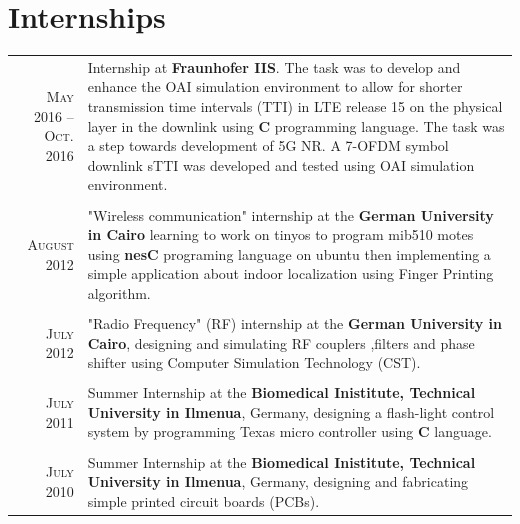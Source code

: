 \documentclass[a4paper,10pt]{article}
\begin{document}
\section{Internships}
\begin{tabular}{r|p{11cm}}
	\textsc{May 2016 – Oct. 2016} & Internship at {\bf Fraunhofer IIS}. The task was to develop and enhance the {OAI} simulation environment to allow for shorter transmission time intervals ({TTI}) in LTE release 15 on the physical layer in the downlink using {\bf C} programming language. The task was a step towards development of 5G NR. A 7-OFDM symbol downlink {sTTI} was developed and tested using OAI simulation environment. \\
	& \\
	\textsc{August} 2012 & "Wireless communication" internship at the {\bf German University in Cairo} learning to work on tinyos to program mib510 motes using \textbf{nesC} programing language on ubuntu then implementing a simple application about indoor localization using Finger Printing algorithm.\\
	& \\
	\textsc{July} 2012 & "Radio Frequency" (RF) internship at the {\bf German University in Cairo}, designing and simulating RF couplers ,filters and phase shifter using  Computer Simulation Technology (CST).\\ 
	& \\
	\textsc{July} 2011 & Summer Internship at the {\bf Biomedical Inistitute, Technical University in Ilmenua}, Germany, designing a flash-light control system by programming Texas micro controller using \textbf{C} language.\\ 
	& \\
	\textsc{July} 2010  & Summer Internship at the {\bf Biomedical Inistitute, Technical University in Ilmenua}, Germany, designing and fabricating simple printed circuit boards (PCBs).\\
	
\end{tabular}

\end{document}

